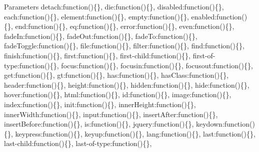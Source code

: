 \begin{DoxyParams}{Parameters}
\textquotesingle{}detach\textquotesingle{}\+:function()\{\}, \textquotesingle{}die\textquotesingle{}\+:function()\{\}, \textquotesingle{}disabled\textquotesingle{}\+:function()\{\}, \textquotesingle{}each\textquotesingle{}\+:function()\{\}, \textquotesingle{}element\textquotesingle{}\+:function()\{\}, \textquotesingle{}empty\textquotesingle{}\+:function()\{\}, \textquotesingle{}enabled\textquotesingle{}\+:function()\{\}, \textquotesingle{}end\textquotesingle{}\+:function()\{\}, \textquotesingle{}eq\textquotesingle{}\+:function()\{\}, \textquotesingle{}error\textquotesingle{}\+:function()\{\}, \textquotesingle{}even\textquotesingle{}\+:function()\{\}, \textquotesingle{}fade\+In\textquotesingle{}\+:function()\{\}, \textquotesingle{}fade\+Out\textquotesingle{}\+:function()\{\}, \textquotesingle{}fade\+To\textquotesingle{}\+:function()\{\}, \textquotesingle{}fade\+Toggle\textquotesingle{}\+:function()\{\}, \textquotesingle{}file\textquotesingle{}\+:function()\{\}, \textquotesingle{}filter\textquotesingle{}\+:function()\{\}, \textquotesingle{}find\textquotesingle{}\+:function()\{\}, \textquotesingle{}finish\textquotesingle{}\+:function()\{\}, \textquotesingle{}first\textquotesingle{}\+:function()\{\}, \textquotesingle{}first-\/child\textquotesingle{}\+:function()\{\}, \textquotesingle{}first-\/of-\/type\textquotesingle{}\+:function()\{\}, \textquotesingle{}focus\textquotesingle{}\+:function()\{\}, \textquotesingle{}focusin\textquotesingle{}\+:function()\{\}, \textquotesingle{}focusout\textquotesingle{}\+:function()\{\}, \textquotesingle{}get\textquotesingle{}\+:function()\{\}, \textquotesingle{}gt\textquotesingle{}\+:function()\{\}, \textquotesingle{}has\textquotesingle{}\+:function()\{\}, \textquotesingle{}has\+Class\textquotesingle{}\+:function()\{\}, \textquotesingle{}header\textquotesingle{}\+:function()\{\}, \textquotesingle{}height\textquotesingle{}\+:function()\{\}, \textquotesingle{}hidden\textquotesingle{}\+:function()\{\}, \textquotesingle{}hide\textquotesingle{}\+:function()\{\}, \textquotesingle{}hover\textquotesingle{}\+:function()\{\}, \textquotesingle{}html\textquotesingle{}\+:function()\{\}, \textquotesingle{}id\textquotesingle{}\+:function()\{\}, \textquotesingle{}image\textquotesingle{}\+:function()\{\}, \textquotesingle{}index\textquotesingle{}\+:function()\{\}, \textquotesingle{}init\textquotesingle{}\+:function()\{\}, \textquotesingle{}inner\+Height\textquotesingle{}\+:function()\{\}, \textquotesingle{}inner\+Width\textquotesingle{}\+:function()\{\}, \textquotesingle{}input\textquotesingle{}\+:function()\{\}, \textquotesingle{}insert\+After\textquotesingle{}\+:function()\{\}, \textquotesingle{}insert\+Before\textquotesingle{}\+:function()\{\}, \textquotesingle{}is\textquotesingle{}\+:function()\{\}, \textquotesingle{}jquery\textquotesingle{}\+:function()\{\}, \textquotesingle{}keydown\textquotesingle{}\+:function()\{\}, \textquotesingle{}keypress\textquotesingle{}\+:function()\{\}, \textquotesingle{}keyup\textquotesingle{}\+:function()\{\}, \textquotesingle{}lang\textquotesingle{}\+:function()\{\}, \textquotesingle{}last\textquotesingle{}\+:function()\{\}, \textquotesingle{}last-\/child\textquotesingle{}\+:function()\{\}, \textquotesingle{}last-\/of-\/type\textquotesingle{}\+:function()\{\}, 
\end{DoxyParams}
